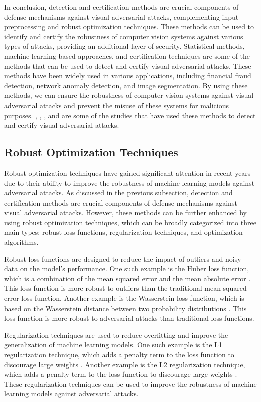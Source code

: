 \documentclass[11pt]{article}
\begin{document}
In conclusion, detection and certification methods are crucial components of defense mechanisms against visual adversarial attacks, complementing input preprocessing and robust optimization techniques. These methods can be used to identify and certify the robustness of computer vision systems against various types of attacks, providing an additional layer of security. Statistical methods, machine learning-based approaches, and certification techniques are some of the methods that can be used to detect and certify visual adversarial attacks. These methods have been widely used in various applications, including financial fraud detection, network anomaly detection, and image segmentation. By using these methods, we can ensure the robustness of computer vision systems against visual adversarial attacks and prevent the misuse of these systems for malicious purposes. \cite{ref122}, \cite{ref123}, \cite{ref124}, and \cite{ref125} are some of the studies that have used these methods to detect and certify visual adversarial attacks.

\subsection{Robust Optimization Techniques}

Robust optimization techniques have gained significant attention in recent years due to their ability to improve the robustness of machine learning models against adversarial attacks. As discussed in the previous subsection, detection and certification methods are crucial components of defense mechanisms against visual adversarial attacks. However, these methods can be further enhanced by using robust optimization techniques, which can be broadly categorized into three main types: robust loss functions, regularization techniques, and optimization algorithms.

Robust loss functions are designed to reduce the impact of outliers and noisy data on the model's performance. One such example is the Huber loss function, which is a combination of the mean squared error and the mean absolute error \cite{ref126}. This loss function is more robust to outliers than the traditional mean squared error loss function. Another example is the Wasserstein loss function, which is based on the Wasserstein distance between two probability distributions \cite{ref127}. This loss function is more robust to adversarial attacks than traditional loss functions.

Regularization techniques are used to reduce overfitting and improve the generalization of machine learning models. One such example is the L1 regularization technique, which adds a penalty term to the loss function to discourage large weights \cite{ref128}. Another example is the L2 regularization technique, which adds a penalty term to the loss function to discourage large weights \cite{ref129}. These regularization techniques can be used to improve the robustness of machine learning models against adversarial attacks.
\end{document}

